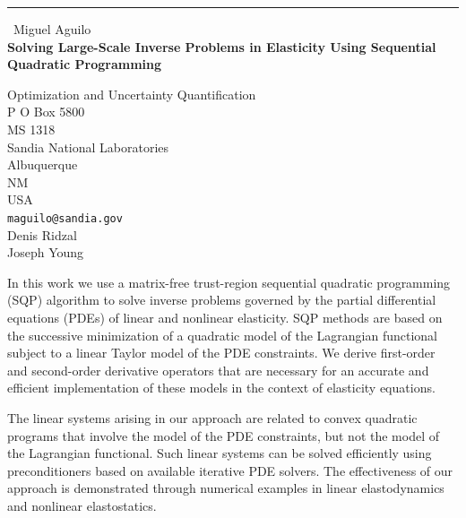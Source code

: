 \documentclass{report}
\begin{document}
\begin{center}
\rule{6in}{1pt} \
{\large Miguel Aguilo \\
{\bf Solving Large-Scale Inverse Problems in Elasticity Using Sequential Quadratic Programming}}

Optimization and Uncertainty Quantification \\ P O Box 5800 \\ MS 1318 \\ Sandia National Laboratories \\ Albuquerque \\ NM \\ USA
\\
{\tt maguilo@sandia.gov}\\
Denis Ridzal\\
Joseph Young\end{center}

In this work we use a matrix-free trust-region sequential
quadratic programming (SQP) algorithm to solve inverse
problems governed by the partial differential equations
(PDEs) of linear and nonlinear elasticity.
SQP methods are based on the successive minimization of a
quadratic model of the Lagrangian functional subject to a
linear Taylor model of the PDE constraints.
We derive first-order and second-order derivative operators
that are necessary for an accurate and efficient
implementation of these models in the context of elasticity
equations.

The linear systems arising in our approach are related to
convex quadratic programs that involve the model of the PDE
constraints, but not the model of the Lagrangian functional.
Such linear systems can be solved efficiently using
preconditioners based on available iterative PDE solvers.
The effectiveness of our approach is demonstrated through
numerical examples in linear elastodynamics and nonlinear
elastostatics.
\end{document}

